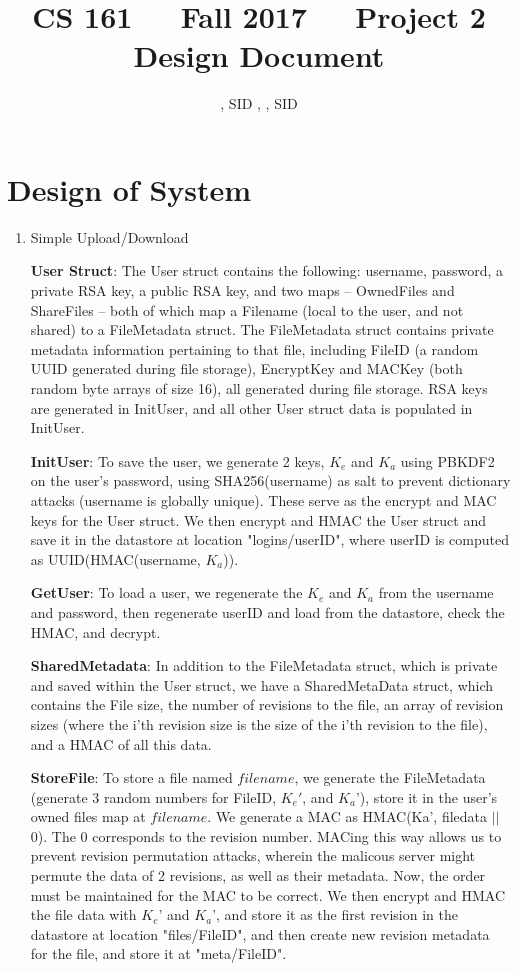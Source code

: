 \documentclass[11pt]{article}
\title{CS 161\ \ \ Fall 2017\ \ \ Project 2 Design Document}
\author{\NameA, SID \SIDA, \NameB, SID \SIDB}
\date{}
\begin{document}
\maketitle

\section{Design of System}
\begin{enumerate}
\item{Simple Upload/Download}

\textbf{User Struct}: The User struct contains the following: username, password, a private RSA key, a public RSA key, and two maps -- OwnedFiles and ShareFiles -- both of which map a Filename (local to the user, and not shared) to a FileMetadata struct. The FileMetadata struct contains private metadata information pertaining to that file, including FileID (a random UUID generated during file storage), EncryptKey and MACKey (both random byte arrays of size 16), all generated during file storage. RSA keys are generated in InitUser, and all other User struct data is populated in InitUser.

\textbf{InitUser}: To save the user, we generate 2 keys, $K_e$ and $K_a$ using PBKDF2 on the user's password, using SHA256(username) as salt to prevent dictionary attacks (username is globally unique). These serve as the encrypt and MAC keys for the User struct. We then encrypt and HMAC the User struct and save it in the datastore at location "logins/userID", where userID is computed as UUID(HMAC(username, $K_a$)).

\textbf{GetUser}: To load a user, we regenerate the $K_e$ and $K_a$ from the username and password, then regenerate userID and load from the datastore, check the HMAC, and decrypt.

\textbf{SharedMetadata}: In addition to the FileMetadata struct, which is private and saved within the User struct, we have a SharedMetaData struct, which contains the File size, the number of revisions to the file, an array of revision sizes (where the i'th revision size is the size of the i'th revision to the file), and a HMAC of all this data.

\textbf{StoreFile}: To store a file named $filename$, we generate the FileMetadata (generate 3 random numbers for FileID, $K_e'$, and $K_a$'), store it in the user's owned files map at $filename$. We generate a MAC as HMAC(Ka', filedata $||$\ $0$). The $0$ corresponds to the revision number. MACing this way allows us to prevent revision permutation attacks, wherein the malicous server might permute the data of 2 revisions, as well as their metadata. Now, the order must be maintained for the MAC to be correct. We then encrypt and HMAC the file data with $K_e$' and $K_a$', and store it as the first revision in the datastore at location "files/FileID", and then create new revision metadata for the file, and store it at "meta/FileID".


\end{enumerate}
\end{document}
